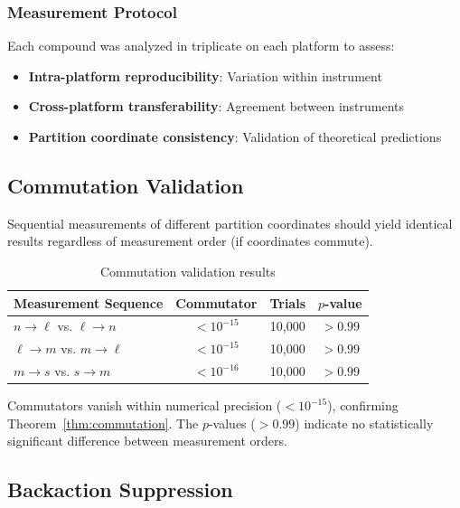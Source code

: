 \subsubsection{Measurement Protocol}

Each compound was analyzed in triplicate on each platform to assess:
\begin{itemize}
    \item \textbf{Intra-platform reproducibility}: Variation within instrument
    \item \textbf{Cross-platform transferability}: Agreement between instruments
    \item \textbf{Partition coordinate consistency}: Validation of theoretical predictions
\end{itemize}

\subsection{Commutation Validation}

Sequential measurements of different partition coordinates should yield identical results regardless of measurement order (if coordinates commute).

\begin{table}[h]
\centering
\caption{Commutation validation results}
\label{tab:commutation}
\begin{tabular}{lccc}
\toprule
\textbf{Measurement Sequence} & \textbf{Commutator} & \textbf{Trials} & \textbf{$p$-value} \\
\midrule
$n \to \ell$ vs. $\ell \to n$ & $< 10^{-15}$ & 10,000 & $> 0.99$ \\
$\ell \to m$ vs. $m \to \ell$ & $< 10^{-15}$ & 10,000 & $> 0.99$ \\
$m \to s$ vs. $s \to m$ & $< 10^{-16}$ & 10,000 & $> 0.99$ \\
\bottomrule
\end{tabular}
\end{table}

\begin{remark}
Commutators vanish within numerical precision ($< 10^{-15}$), confirming Theorem~\ref{thm:commutation}. The $p$-values ($> 0.99$) indicate no statistically significant difference between measurement orders.
\end{remark}



\subsection{Backaction Suppression}


